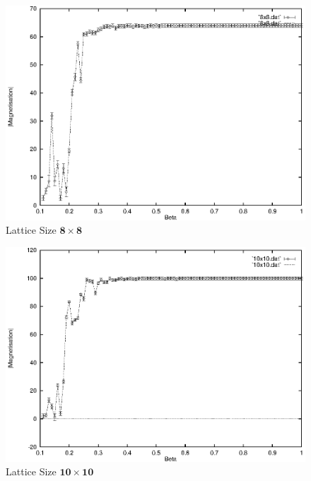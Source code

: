 \documentclass[a4paper]{IEEEtran}
\begin{document}
    \begin{figure}
    \caption{Lattice Size $\mathbf{8 \times 8}$}
    \label{fig:8x8-1} 
    \begin{center}
        \includegraphics[width=\columnwidth]{8x8_1.eps}
    \end{center}
    \end{figure} 

    \begin{figure} 
    \caption{Lattice Size $\mathbf{10 \times 10}$}
    \label{fig:10x10-1} 
    \begin{center}
        \includegraphics[width=\columnwidth]{10x10_1.eps}
    \end{center}
    \end{figure} 
\end{document}
